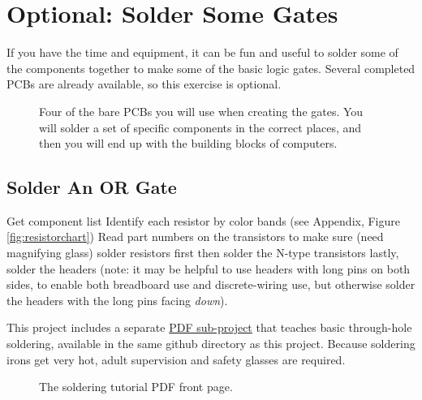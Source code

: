 \section{Optional: Solder Some Gates}

If you have the time and equipment, it can be fun and useful to solder some of the components together to make some of the basic logic gates. Several completed PCBs are already available, so this exercise is optional. %

\begin{figure}[ht!]
\begin{center}
\end{center}
\caption{Four of the bare PCBs you will use when creating the gates. You will solder a set of specific components in the correct places, and then you will end up with the building blocks of computers.}
\label{fig:barepcbs}
\end{figure}

\subsection*{Solder An OR Gate}

\bi

\+ Get component list 
\+ Identify each resistor by color bands (see Appendix, Figure \ref{fig:resistorchart})
\+ Read part numbers on the transistors to make sure (need magnifying glass)
\+ solder resistors first
\+ then solder the N-type transistors 
\+ lastly, solder the headers (note: it may be helpful to use headers with long pins on both sides, to enable both breadboard use and discrete-wiring use, but otherwise solder the headers with the long pins facing \emph{down}).

\ei

This project includes a separate {\color{webblue}\href{https://github.com/jessehamner/TechMillForKids/tree/master/soldering}{PDF sub-project}} that teaches basic through-hole soldering, available in the same github directory as this project. Because soldering irons get very hot, adult supervision and safety glasses are required.

\begin{figure}[hb!]
\begin{center}
\end{center}
\caption{The soldering tutorial PDF front page.}
\label{fig:soldering}
\end{figure}


